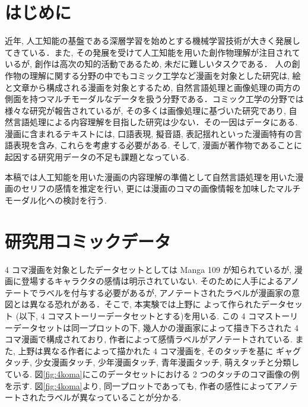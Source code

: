 \documentclass[twocolumn]{jarticle}     %
\begin{document}

\section{はじめに}
近年, 人工知能の基盤である深層学習を始めとする機械学習技術が大きく発展してきている．また, その発展を受けて人工知能を用いた創作物理解が注目されているが, 創作は高次の知的活動であるため, 未だに難しいタスクである．
人の創作物の理解に関する分野の中でもコミック工学など漫画を対象とした研究は, 絵と文章から構成される漫画を対象とするため, 自然言語処理と画像処理の両方の側面を持つマルチモーダルなデータを扱う分野である．コミック工学の分野では様々な研究が報告されているが, その多くは画像処理に基づいた研究であり, 自然言語処理による内容理解を目指した研究は少ない．その一因はデータにある. 漫画に含まれるテキストには, 口語表現, 擬音語, 表記揺れといった漫画特有の言語表現を含み, これらを考慮する必要がある. そして, 漫画が著作物であることに起因する研究用データの不足も課題となっている.

本稿では人工知能を用いた漫画の内容理解の準備として自然言語処理を用いた漫画のセリフの感情を推定を行い, 更には漫画のコマの画像情報を加味したマルチモーダル化への検討を行う.

\section{研究用コミックデータ}
4 コマ漫画を対象としたデータセットとしては Manga 109 が知られているが, 漫画に登場するキャラクタの感情は明示されていない. そのために人手によるアノテートでラベルを付与する必要があるが, アノテートされたラベルが漫画家の意図とは異なる恐れがある．そこで, 本実験では上野に
よって作られたデータセット\cite{ueno_miki2018} (以下, 4 コマストーリーデータセットとする)を用いる. この 4 コマストーリーデータセットは同一プロットの下, 幾人かの漫画家によって描き下ろされた 4 コマ漫画で構成されており, 作者によって感情ラベルがアノテートされている.
また, 上野は異なる作者によって描かれた 4 コマ漫画を, そのタッチを基に
ギャグタッチ, 少女漫画タッチ, 少年漫画タッチ, 青年漫画タッチ, 萌えタッチと分類している. 図\ref{fig:4koma}にこのデータセットにおける 2 つのタッチのコマ画像の例を示す. 図\ref{fig:4koma}より, 同一プロットであっても, 作者の感性によってアノテートされたラベルが異なっていることが分かる.
\end{document}
